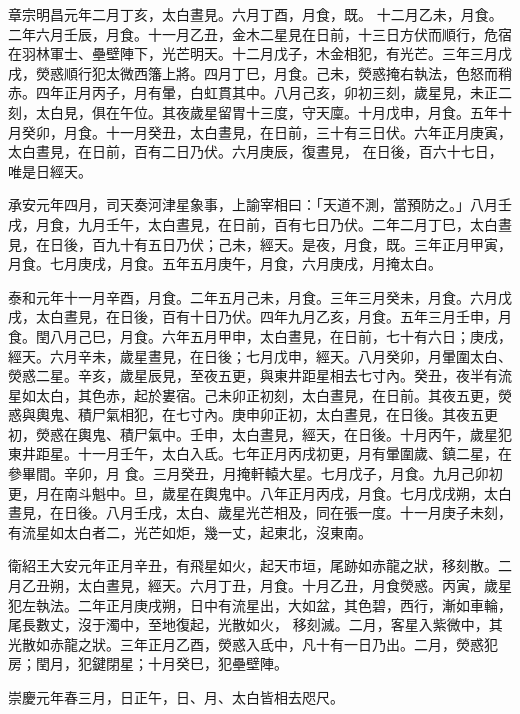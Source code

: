 \begin{pinyinscope}
 章宗明昌元年二月丁亥，太白晝見。六月丁酉，月食，既。
 十二月乙未，月食。二年六月壬辰，月食。十一月乙丑，金木二星見在日前，十三日方伏而順行，危宿在羽林軍士、壘壁陣下，光芒明天。十二月戊子，木金相犯，有光芒。三年三月戊戌，熒惑順行犯太微西籓上將。四月丁巳，月食。己未，熒惑掩右執法，色怒而稍赤。四年正月丙子，月有暈，白虹貫其中。八月己亥，卯初三刻，歲星見，未正二刻，太白見，俱在午位。其夜歲星留胃十三度，守天廩。十月戊申，月食。五年十月癸卯，月食。十一月癸丑，太白晝見，在日前，三十有三日伏。六年正月庚寅，太白晝見，在日前，百有二日乃伏。六月庚辰，復晝見，
 在日後，百六十七日，唯是日經天。



 承安元年四月，司天奏河津星象事，上諭宰相曰：「天道不測，當預防之。」八月壬戌，月食，九月壬午，太白晝見，在日前，百有七日乃伏。二年二月丁巳，太白晝見，在日後，百九十有五日乃伏；己未，經天。是夜，月食，既。三年正月甲寅，月食。七月庚戌，月食。五年五月庚午，月食，六月庚戌，月掩太白。



 泰和元年十一月辛酉，月食。二年五月己未，月食。三年三月癸未，月食。六月戊戌，太白晝見，在日後，百有十日乃伏。四年九月乙亥，月食。五年三月壬申，月
 食。閏八月己巳，月食。六年五月甲申，太白晝見，在日前，七十有六日；庚戌，經天。六月辛未，歲星晝見，在日後；七月戊申，經天。八月癸卯，月暈圍太白、熒惑二星。辛亥，歲星辰見，至夜五更，與東井距星相去七寸內。癸丑，夜半有流星如太白，其色赤，起於婁宿。己未卯正初刻，太白晝見，在日前。其夜五更，熒惑與輿鬼、積尸氣相犯，在七寸內。庚申卯正初，太白晝見，在日後。其夜五更初，熒惑在輿鬼、積尸氣中。壬申，太白晝見，經天，在日後。十月丙午，歲星犯東井距星。十一月壬午，太白入氐。七年正月丙戌初更，月有暈圍歲、鎮二星，在參畢間。辛卯，月
 食。三月癸丑，月掩軒轅大星。七月戊子，月食。九月己卯初更，月在南斗魁中。旦，歲星在輿鬼中。八年正月丙戌，月食。七月戊戌朔，太白晝見，在日後。八月壬戌，太白、歲星光芒相及，同在張一度。十一月庚子未刻，有流星如太白者二，光芒如炬，幾一丈，起東北，沒東南。



 衛紹王大安元年正月辛丑，有飛星如火，起天市垣，尾跡如赤龍之狀，移刻散。二月乙丑朔，太白晝見，經天。六月丁丑，月食。十月乙丑，月食熒惑。丙寅，歲星犯左執法。二年正月庚戌朔，日中有流星出，大如盆，其色碧，西行，漸如車輪，尾長數丈，沒于濁中，至地復起，光散如火，
 移刻滅。二月，客星入紫微中，其光散如赤龍之狀。三年正月乙酉，熒惑入氐中，凡十有一日乃出。二月，熒惑犯房；閏月，犯鍵閉星；十月癸巳，犯壘壁陣。



 崇慶元年春三月，日正午，日、月、太白皆相去咫尺。




\end{pinyinscope}

